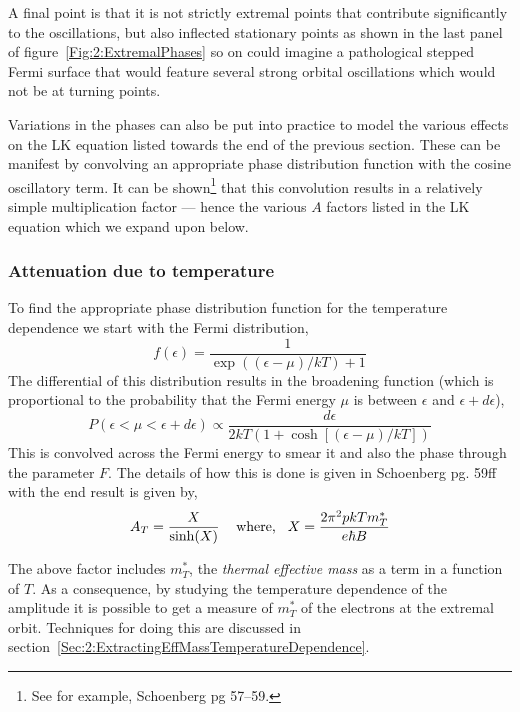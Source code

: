 A final point is that it is not strictly extremal points that contribute significantly to the oscillations, but also inflected stationary points as shown in the last panel of figure~\ref{Fig:2:ExtremalPhases} so on could imagine a pathological stepped Fermi surface that would feature several strong orbital oscillations which would not be at turning points.

Variations in the phases can also be put into practice to model the various effects on the \ac{LK} equation listed towards the end of the previous section. These can be manifest by convolving an appropriate phase distribution function with the cosine oscillatory term. It can be shown\footnote{See for example, Schoenberg pg 57--59.\cite{Schoenberg1984}} that this convolution results in a relatively simple multiplication factor --- hence the various $A$ factors listed in the \ac{LK} equation which we expand upon below.

\subsubsection{Attenuation due to temperature}

To find the appropriate phase distribution function for the temperature dependence we start with the Fermi distribution,
\begin{equation}
f(\epsilon) = \frac{1}{\exp\left((\epsilon-\mu)/kT\right) + 1}
\end{equation} 
The differential of this distribution results in the broadening function (which is proportional to the probability that the Fermi energy $\mu$ is between $\epsilon$ and $\epsilon + d\epsilon$),
\begin{equation}
  P(\epsilon < \mu < \epsilon + d\epsilon) \propto \frac{d\epsilon}{2kT(1 + \cosh[(\epsilon - \mu)/kT])}
\end{equation}
This is convolved across the Fermi energy to smear it and also the phase through the parameter $F$. The details of how this is done is given in Schoenberg pg. 59ff~\cite{Schoenberg1984} with the end result is given by,
\begin{equation}
  A_T = \frac{X}{\sinh(X)} \textrm{\hspace{0.3cm} where,\hspace{0.3cm}} X = \frac{2\pi^2pkT m^*_T}{e\hbar B}
\end{equation}

The above factor includes $m^*_T$, the \textit{thermal effective mass} as a term in a function of $T$. As a consequence, by studying the temperature dependence of the amplitude it is possible to get a measure of $m^*_T$ of the electrons at the extremal orbit. Techniques for doing this are discussed in section~\ref{Sec:2:ExtractingEffMassTemperatureDependence}.

